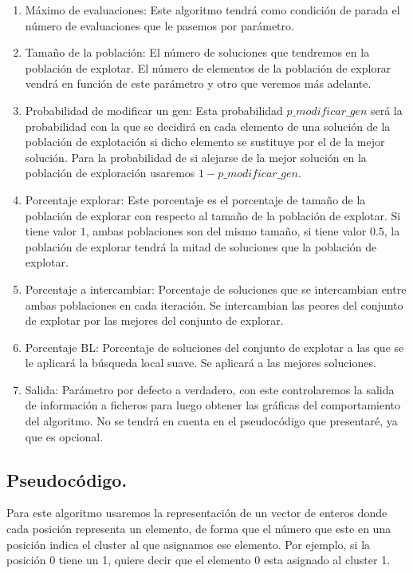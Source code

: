 \documentclass[12pt, spanish]{article}
\begin{document}
\begin{enumerate}
	\item Máximo de evaluaciones: Este algoritmo tendrá como condición de parada el número de evaluaciones que le pasemos por parámetro.
	\item Tamaño de la población: El número de soluciones que tendremos en la población de explotar. El número de elementos de la población de explorar vendrá en función de este parámetro y otro que veremos más adelante.
	\item Probabilidad de modificar un gen: Esta probabilidad $p\_modificar\_gen$ será la probabilidad con la que se decidirá en cada elemento de una solución de la población de explotación si dicho elemento se sustituye por el de la mejor solución. Para la probabilidad de si alejarse de la mejor solución en la población de exploración usaremos $1 - p\_modificar\_gen$.
	\item Porcentaje explorar: Este porcentaje es el porcentaje de tamaño de la población de explorar con respecto al tamaño de la población de explotar. Si tiene valor $1$, ambas poblaciones son del mismo tamaño, si tiene valor $0.5$, la población de explorar tendrá la mitad de soluciones que la población de explotar.
	\item Porcentaje a intercambiar: Porcentaje de soluciones que se intercambian entre ambas poblaciones en cada iteración. Se intercambian las peores del conjunto de explotar por las mejores del conjunto de explorar.
	\item Porcentaje BL: Porcentaje de soluciones del conjunto de explotar a las que se le aplicará la búsqueda local suave. Se aplicará a las mejores soluciones.
	\item Salida: Parámetro por defecto a verdadero, con este controlaremos la salida de información a ficheros para luego obtener las gráficas del comportamiento del algoritmo. No se tendrá en cuenta en el pseudocódigo que presentaré, ya que es opcional.
\end{enumerate}

\newpage


\subsection{Pseudocódigo.}

Para este algoritmo usaremos la representación de un vector de enteros donde cada posición representa un elemento, de forma que el número que este en una posición indica el cluster al que asignamos ese elemento. Por ejemplo, si la posición 0 tiene un 1, quiere decir que el elemento 0 esta asignado al cluster 1.
\end{document}
